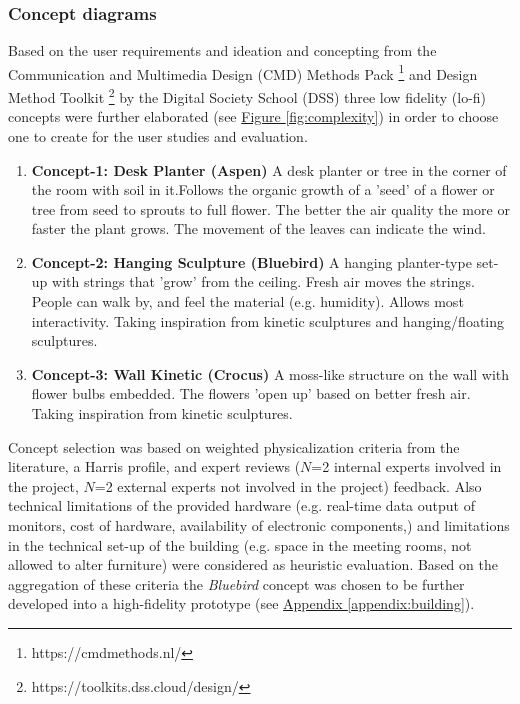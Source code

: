 \subsubsection{Concept diagrams}

Based on the user requirements and ideation and concepting from the Communication and Multimedia Design (CMD) Methods Pack \footnote{https://cmdmethods.nl/} and Design Method Toolkit \footnote{https://toolkits.dss.cloud/design/} by the Digital Society School (DSS) three low fidelity (lo-fi) concepts were further elaborated (see \hyperref[fig:complexity]{Figure \ref*{fig:complexity}}) in order to choose one to create for the user studies and evaluation. 


\begin{enumerate}
  \item \textbf{Concept-1: Desk Planter (Aspen)}
      A desk planter or tree in the corner of the room with soil in it.Follows the organic growth of a 'seed' of a flower or tree from seed to sprouts to full flower. The better the air quality the more or faster the plant grows. The movement of the leaves can indicate the wind.

  \item \textbf{Concept-2: Hanging Sculpture (Bluebird)}
      A hanging planter-type set-up with strings that 'grow' from the ceiling. Fresh air moves the strings. People can walk by, and feel the material (e.g. humidity). Allows most interactivity. Taking inspiration from kinetic sculptures and hanging/floating sculptures.

  \item \textbf{Concept-3: Wall Kinetic (Crocus)}
      A moss-like structure on the wall with flower bulbs embedded. The flowers 'open up' based on better fresh air. Taking inspiration from kinetic sculptures.
\end{enumerate}


Concept selection was based on weighted physicalization criteria from the literature, a Harris profile, and expert reviews ($N$=2 internal experts involved in the project, $N$=2 external experts not involved in the project) feedback. Also technical limitations of the provided hardware (e.g. real-time data output of monitors, cost of hardware, availability of electronic components,) and limitations in the technical set-up of the building (e.g. space in the meeting rooms, not allowed to alter furniture) were considered as heuristic evaluation. Based on the aggregation of these criteria the \textit{Bluebird} concept was chosen to be further developed into a high-fidelity prototype (see \hyperref[appendix:building]{Appendix \ref*{appendix:building}}).


